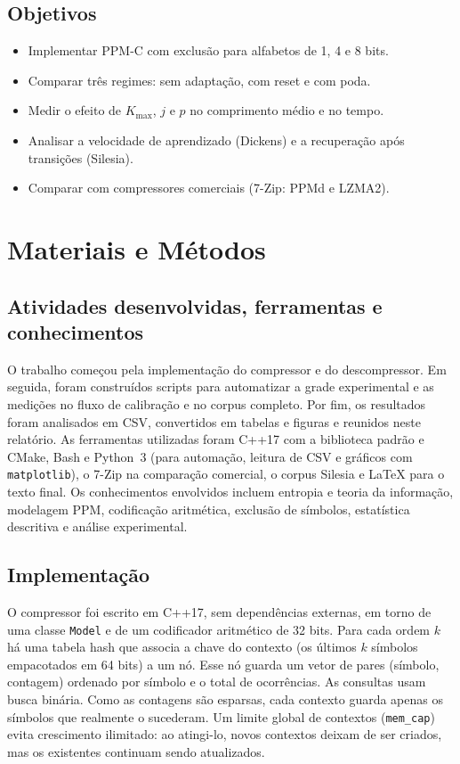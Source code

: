 \documentclass[12pt,a4paper]{article}
\begin{document}
\subsection{Objetivos}
\begin{itemize}[leftmargin=*]
  \item Implementar PPM-C com exclus\~ao para alfabetos de 1, 4 e 8 bits.
  \item Comparar tr\^es regimes: sem adapta\c{c}\~ao, com reset e com poda.
  \item Medir o efeito de $K_{\max}$, $j$ e $p$ no comprimento m\'edio e no tempo.
  \item Analisar a velocidade de aprendizado (Dickens) e a recupera\c{c}\~ao ap\'os
        transi\c{c}\~oes (Silesia).
  \item Comparar com compressores comerciais (7-Zip: PPMd e LZMA2).
\end{itemize}

\section{Materiais e M\'etodos}

\subsection{Atividades desenvolvidas, ferramentas e conhecimentos}
O trabalho come\c{c}ou pela implementa\c{c}\~ao do compressor e do descompressor. Em
seguida, foram constru\'idos scripts para automatizar a grade experimental e as
medi\c{c}\~oes no fluxo de calibra\c{c}\~ao e no corpus completo. Por fim, os
resultados foram analisados em CSV, convertidos em tabelas e figuras e reunidos
neste relat\'orio. As ferramentas utilizadas foram C++17 com a biblioteca
padr\~ao e CMake, Bash e Python~3 (para automa\c{c}\~ao, leitura de CSV e
gr\'aficos com \texttt{matplotlib}), o 7-Zip na compara\c{c}\~ao comercial, o
corpus Silesia e \LaTeX{} para o texto final. Os conhecimentos envolvidos incluem
entropia e teoria da informa\c{c}\~ao, modelagem PPM, codifica\c{c}\~ao
aritm\'etica, exclus\~ao de s\'imbolos, estat\'istica descritiva e an\'alise
experimental.

\subsection{Implementa\c{c}\~ao}
O compressor foi escrito em C++17, sem depend\^encias externas, em torno de uma
classe \texttt{Model} e de um codificador aritm\'etico de 32 bits. Para cada ordem
$k$ h\'a uma tabela hash que associa a chave do contexto (os \'ultimos $k$
s\'imbolos empacotados em 64 bits) a um n\'o. Esse n\'o guarda um vetor de pares
(s\'imbolo, contagem) ordenado por s\'imbolo e o total de ocorr\^encias. As
consultas usam busca bin\'aria. Como as contagens s\~ao esparsas, cada contexto
guarda apenas os s\'imbolos que realmente o sucederam. Um limite global de
contextos (\texttt{mem\_cap}) evita crescimento ilimitado: ao atingi-lo, novos
contextos deixam de ser criados, mas os existentes continuam sendo atualizados.
\end{document}
